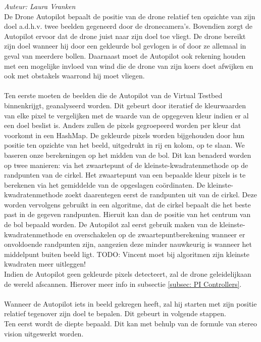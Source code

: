 {\em Auteur: Laura Vranken}\\

\noindent
De Drone Autopilot bepaalt de positie van de drone relatief ten opzichte van zijn doel a.d.h.v. twee beelden gegeneerd door de dronecamera's. Bovendien zorgt de Autopilot ervoor dat de drone juist naar zijn doel toe vliegt. De drone bereikt zijn doel wanneer hij door een gekleurde bol gevlogen is of door ze allemaal in geval van meerdere bollen.  Daarnaast moet de Autopilot ook rekening houden met een mogelijke invloed van wind die de drone van zijn koers doet afwijken en ook met obstakels waarrond hij moet vliegen.
\\
\\
Ten eerste moeten de beelden die de Autopilot van de Virtual Testbed binnenkrijgt, geanalyseerd worden. Dit gebeurt door iteratief de kleurwaarden van elke pixel te vergelijken met de waarde van de opgegeven kleur indien er al een doel beslist is. Anders zullen de pixels gegroepeerd worden per kleur dat voorkomt in een HashMap. De gekleurde pixels worden bijgehouden door hun positie ten opzichte van het beeld, uitgedrukt in rij en kolom, op te slaan. We baseren onze berekeningen op het midden van de bol. Dit kan benaderd worden op twee manieren: via het zwaartepunt of de kleinste-kwadratenmethode op de randpunten van de cirkel. Het zwaartepunt van een bepaalde kleur pixels is te berekenen via het gemiddelde van de opgeslagen co\"ordinaten. De kleinste-kwadratenmethode zoekt daarentegen eerst de randpunten uit van de cirkel. Deze worden vervolgens gebruikt in een algoritme, dat de cirkel bepaalt die het beste past in de gegeven randpunten. Hieruit kan dan de positie van het centrum van de bol bepaald worden. \cite{website:kleinsteKwadraten} De Autopilot zal eerst gebruik maken van de kleinste-kwadratenmethode en overschakelen op de zwaartepuntberekening wanneer er onvoldoende randpunten zijn, aangezien deze minder nauwkeurig is wanneer het middelpunt buiten beeld ligt.
TODO: Vincent moet bij algoritmen zijn kleinste kwadraten meer uitleggen!
\\
Indien de Autopilot geen gekleurde pixels detecteert, zal de drone geleidelijkaan de wereld afscannen. Hierover meer info in subsectie \ref{subsec: PI Controllers}.
\\
\\
Wanneer de Autopilot iets in beeld gekregen heeft, zal hij starten met zijn positie relatief tegenover zijn doel te bepalen. Dit gebeurt in volgende stappen.
\\
Ten eerst wordt de diepte bepaald. Dit kan met behulp van de formule van stereo vision \cite{website:techbriefs} uitgewerkt worden.
